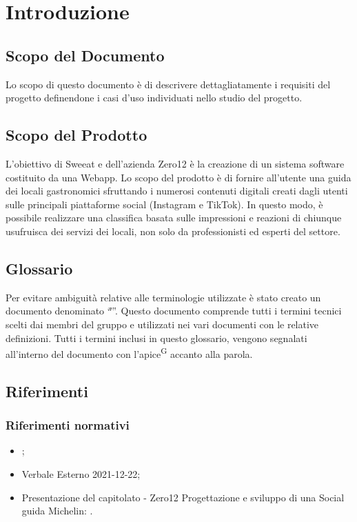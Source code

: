 \section{Introduzione}

\subsection{Scopo del Documento}
Lo scopo di questo documento è di descrivere dettagliatamente i requisiti del progetto definendone i casi d’uso individuati nello studio del progetto.

\subsection{Scopo del Prodotto}

L’obiettivo di Sweeat e dell’azienda Zero12 è la creazione di un sistema software costituito da una Webapp. Lo scopo del prodotto è di fornire all’utente una guida dei locali gastronomici sfruttando i numerosi contenuti digitali creati dagli utenti sulle principali piattaforme social (Instagram e TikTok). In questo modo, è possibile realizzare una classifica basata sulle impressioni e reazioni di chiunque usufruisca dei servizi dei locali, non solo da professionisti ed esperti del settore.

\subsection{Glossario}

Per evitare ambiguità relative alle terminologie utilizzate è stato creato un documento denominato “\textit{\G}”. Questo documento comprende tutti i termini tecnici scelti dai membri del gruppo e utilizzati nei vari documenti con le relative definizioni. Tutti i termini inclusi in questo glossario, vengono segnalati all’interno del documento con l’apice\textsuperscript{G} accanto alla parola.

\subsection{Riferimenti}

\subsubsection{Riferimenti normativi}
\begin{itemize}
    \item \NdP{};
    \item Verbale Esterno 2021-12-22;
    \item Presentazione del capitolato - Zero12 Progettazione e sviluppo di una Social guida Michelin: \newline {}.
\end{itemize}
